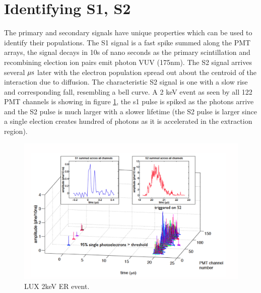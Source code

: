 \section{Identifying S1, S2}
The primary and secondary signals have unique properties which can be used to identify their populations. The S1 signal is a fast spike summed along the PMT arrays, the signal decays in 10s of nano seconds as the primary scintillation and recombining election ion pairs emit photon VUV (175nm). The S2 signal arrives several $\rm \mu s$ later with the electron population spread out about the centroid of the interaction due to diffusion. The characteristic S2 signal is one with a slow rise and corresponding fall, resembling a bell curve. A 2 keV event as seen by all 122 PMT channels is showing in figure \ref{fig:LUX_Golden}, the s1 pulse is spiked as the photons arrive and the S2 pulse is much larger with a slower lifetime (the S2 pulse is larger since a single election creates hundred of photons as it is accelerated in the extraction region). 


 \begin{figure}[h!]\centering
\includegraphics[width=150mm]{Chapter_LUX_Det/LUX_Golden_Event_2keV.png}
\caption{LUX 2keV ER event.}
\label{fig:LUX_Golden}
\end{figure}

